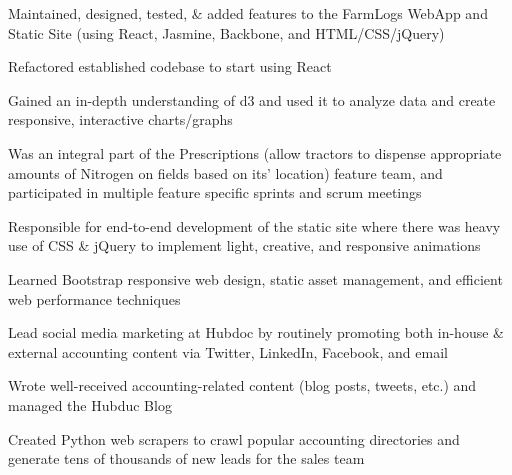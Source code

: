 \documentclass[letterpaper]{deedy-resume} %
\begin{document}
\begin{minipage}[t]{0.66\textwidth}
  \sectionspace %



  \begin{tightitemize}
  \item Maintained, designed, tested, \& added features to the FarmLogs WebApp and Static Site (using React, Jasmine, Backbone, and HTML/CSS/jQuery)
  \item Refactored established codebase to start using React
  \item Gained an in-depth understanding of d3 and used it to analyze data and create responsive, interactive charts/graphs
  \item Was an integral part of the Prescriptions (allow tractors to dispense appropriate amounts of Nitrogen on fields based on its' location) feature team, and participated in multiple feature specific sprints and scrum meetings
  \end{tightitemize}

  \sectionspace %



  \begin{tightitemize}
  \item Responsible for end-to-end development of the static site where there was heavy use of CSS \& jQuery to implement light, creative, and responsive animations
  \item Learned Bootstrap responsive web design, static asset management, and efficient web performance techniques
  \item Lead social media marketing at Hubdoc by routinely promoting both in-house \& external accounting content via Twitter, LinkedIn, Facebook, and email
  \item Wrote well-received accounting-related content (blog posts, tweets, etc.) and managed the Hubduc Blog
  \item Created Python web scrapers to crawl popular accounting directories and generate tens of thousands of new leads for the sales team
  \end{tightitemize}


\end{minipage}
\end{document}
